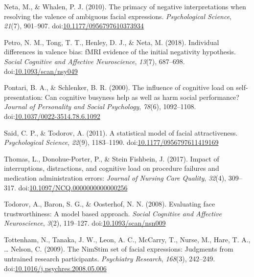 \documentclass[man]{apa6}
\begin{document}
\leavevmode\hypertarget{ref-neta_primacy_2010}{}%
Neta, M., \& Whalen, P. J. (2010). The primacy of negative interpretations when resolving the valence of ambiguous facial expressions. \emph{Psychological Science}, \emph{21}(7), 901--907. doi:\href{https://doi.org/10.1177/0956797610373934}{10.1177/0956797610373934}

\leavevmode\hypertarget{ref-petro_individual_2018}{}%
Petro, N. M., Tong, T. T., Henley, D. J., \& Neta, M. (2018). Individual differences in valence bias: fMRI evidence of the initial negativity hypothesis. \emph{Social Cognitive and Affective Neuroscience}, \emph{13}(7), 687--698. doi:\href{https://doi.org/10.1093/scan/nsy049}{10.1093/scan/nsy049}

\leavevmode\hypertarget{ref-pontari_influence_2000}{}%
Pontari, B. A., \& Schlenker, B. R. (2000). The influence of cognitive load on self-presentation: Can cognitive busyness help as well as harm social performance? \emph{Journal of Personality and Social Psychology}, \emph{78}(6), 1092--1108. doi:\href{https://doi.org/10.1037/0022-3514.78.6.1092}{10.1037/0022-3514.78.6.1092}

\leavevmode\hypertarget{ref-said_statistical_2011}{}%
Said, C. P., \& Todorov, A. (2011). A statistical model of facial attractiveness. \emph{Psychological Science}, \emph{22}(9), 1183--1190. doi:\href{https://doi.org/10.1177/0956797611419169}{10.1177/0956797611419169}

\leavevmode\hypertarget{ref-thomas_impact_2017}{}%
Thomas, L., Donohue-Porter, P., \& Stein Fishbein, J. (2017). Impact of interruptions, distractions, and cognitive load on procedure failures and medication administration errors: \emph{Journal of Nursing Care Quality}, \emph{32}(4), 309--317. doi:\href{https://doi.org/10.1097/NCQ.0000000000000256}{10.1097/NCQ.0000000000000256}

\leavevmode\hypertarget{ref-todorov_evaluating_2008}{}%
Todorov, A., Baron, S. G., \& Oosterhof, N. N. (2008). Evaluating face trustworthiness: A model based approach. \emph{Social Cognitive and Affective Neuroscience}, \emph{3}(2), 119--127. doi:\href{https://doi.org/10.1093/scan/nsn009}{10.1093/scan/nsn009}

\leavevmode\hypertarget{ref-tottenham_nimstim_2009}{}%
Tottenham, N., Tanaka, J. W., Leon, A. C., McCarry, T., Nurse, M., Hare, T. A., \ldots{} Nelson, C. (2009). The NimStim set of facial expressions: Judgments from untrained research participants. \emph{Psychiatry Research}, \emph{168}(3), 242--249. doi:\href{https://doi.org/10.1016/j.psychres.2008.05.006}{10.1016/j.psychres.2008.05.006}
\end{document}
